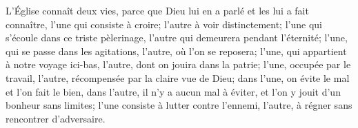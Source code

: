 L’Église connaît deux vies,
	parce que Dieu lui en a parlé et les lui a fait connaître,
	l’une qui consiste à croire; l’autre à voir distinctement;
	l’une qui s’écoule dans ce triste pèlerinage,
		l’autre qui demeurera pendant l’éternité;
	l’une, qui se passe dans les agitations, l’autre, où l’on se reposera;
	l’une, qui appartient à notre voyage ici-bas,
		l’autre, dont on jouira dans la patrie;
	l’une, occupée par le travail,
		l’autre, récompensée par la claire vue de Dieu;
	dans l’une, on évite le mal et l’on fait le bien,
	dans l’autre, il n’y a aucun mal à éviter,
		et l’on y jouit d’un bonheur sans limites;
	l’une consiste à lutter contre l’ennemi,
		l’autre, à régner sans rencontrer d’adversaire.
